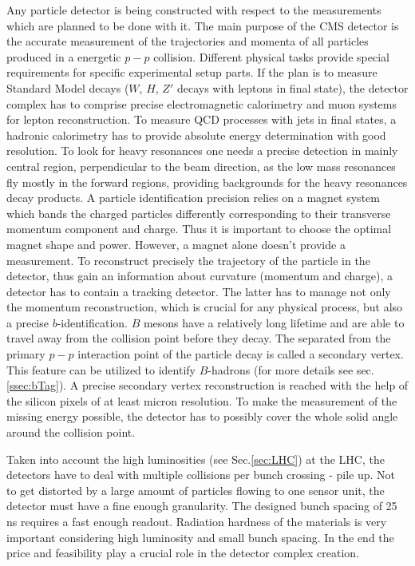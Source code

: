 Any particle detector is being constructed with respect to the measurements which are planned to be done with it. The main purpose of the CMS detector
is the accurate measurement of the trajectories and momenta of all particles produced in a energetic $p-p$ collision. Different physical
tasks provide special requirements for specific experimental setup parts. If the plan is to measure Standard Model decays
($W$, $H$, $Z'$ decays with leptons in final state), the detector complex has to comprise precise electromagnetic calorimetry and 
muon systems for lepton reconstruction. To measure QCD processes with jets in final states, a
hadronic calorimetry has to provide absolute energy determination with good resolution. To look for heavy resonances one needs a
precise detection in mainly central region, perpendicular to the beam direction, as the low mass resonances fly mostly in the forward
regions, providing backgrounds for the heavy resonances decay products. A particle identification precision relies on a magnet system which bands the charged 
particles differently corresponding to their transverse momentum component and charge. Thus it is important to choose the optimal magnet
shape and power. However, a magnet alone doesn't provide a measurement. To reconstruct precisely the trajectory of the particle in the detector, thus
gain an information about curvature (momentum and charge), a detector has to contain a tracking detector. The latter has to manage not only the momentum
reconstruction, which is crucial for any physical process, but also a precise $b$-identification. $B$ mesons have a relatively long lifetime and are able 
to travel away from the collision point before they decay. The separated from the primary $p-p$ interaction point of the particle decay is called a secondary
vertex. This feature can be utilized to identify $B$-hadrons (for more details see sec. \ref{ssec:bTag}). A precise secondary vertex reconstruction is reached with the help of the silicon
pixels of at least micron resolution. To make the measurement of the missing energy possible, the detector has to possibly cover the whole solid angle
around the collision point.

Taken into account the high luminosities (see Sec.\ref{sec:LHC}) at the LHC,
the detectors have to deal with multiple collisions per bunch crossing - pile up. Not to get distorted by a large amount of particles 
flowing to one sensor unit, the detector must have a fine enough granularity. The designed bunch spacing of 25 ns 
requires a fast enough readout. Radiation hardness of the materials is very important considering high luminosity and small
bunch spacing. In the end the price and feasibility play a crucial role in the detector complex creation.

